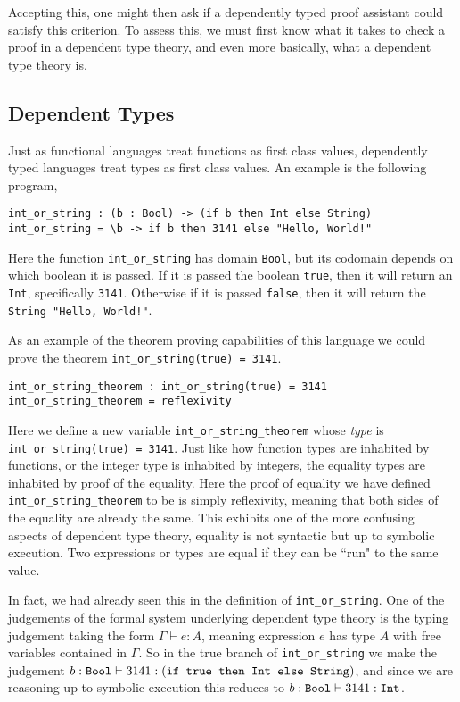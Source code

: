 \documentclass{article}
\begin{document}
Accepting this, one might then ask if a dependently typed proof assistant could satisfy this criterion.
To assess this, we must first know what it takes to check a proof in a dependent type theory, and even more basically, what a dependent type theory is.

\subsection{Dependent Types}

Just as functional languages treat functions as first class values, dependently typed languages treat types as first class values.
An example is the following program, 

\begin{verbatim}
int_or_string : (b : Bool) -> (if b then Int else String)
int_or_string = \b -> if b then 3141 else "Hello, World!"
\end{verbatim}

Here the function \verb|int_or_string| has domain \texttt{Bool}, but its codomain depends on which boolean it is passed.
If it is passed the boolean \texttt{true}, then it will return an \texttt{Int}, specifically \texttt{3141}.
Otherwise if it is passed \texttt{false}, then it will return the \texttt{String "Hello, World!"}.

As an example of the theorem proving capabilities of this language we could prove the theorem \verb|int_or_string(true) = 3141|.

\begin{verbatim}
int_or_string_theorem : int_or_string(true) = 3141
int_or_string_theorem = reflexivity
\end{verbatim}

Here we define a new variable \verb|int_or_string_theorem| whose \textit{type} is \\ \verb|int_or_string(true) = 3141|.
Just like how function types are inhabited by functions, or the integer type is inhabited by integers, the equality types are inhabited by proof of the equality.
Here the proof of equality we have defined \verb|int_or_string_theorem| to be is simply reflexivity, meaning that both sides of the equality are already the same.
This exhibits one of the more confusing aspects of dependent type theory, equality is not syntactic but up to symbolic execution.
Two expressions or types are equal if they can be ``run" to the same value.

In fact, we had already seen this in the definition of \verb|int_or_string|.
One of the judgements of the formal system underlying dependent type theory is the typing judgement taking the form $\Gamma \vdash e : A$, meaning expression $e$ has type $A$ with free variables contained in $\Gamma$.
So in the true branch of \verb|int_or_string| we make the judgement $b : \verb|Bool| \vdash 3141 : (\verb|if true then Int else String|)$, and since we are reasoning up to symbolic execution this reduces to $b : \verb|Bool| \vdash 3141 : \verb|Int|$.
\end{document}
